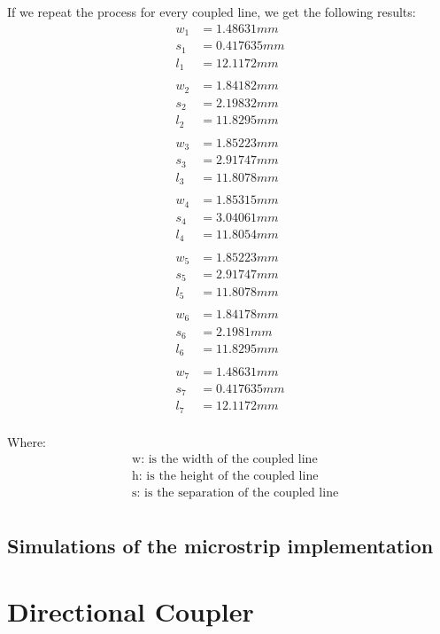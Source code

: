 \documentclass[12pt]{report} %
\begin{document}
If we repeat the process for every coupled line, we get the following results:
\begin{align*}
w_1 &= 1.48631 mm\\
s_1 &= 0.417635 mm \\
l_1 &= 12.1172 mm \\
\\
w_2 &= 1.84182 mm \\
s_2 &= 2.19832 mm \\
l_2 &= 11.8295 mm \\
\\
w_3 &= 1.85223 mm \\
s_3 &= 2.91747 mm \\
l_3 &= 11.8078 mm \\
\\
w_4 &= 1.85315 mm \\
s_4 &= 3.04061 mm \\
l_4 &= 11.8054 mm \\
\\
w_5 &= 1.85223 mm \\
s_5 &= 2.91747 mm \\
l_5 &= 11.8078 mm \\
\\
w_6 &= 1.84178 mm \\
s_6 &= 2.1981 mm \\
l_6 &= 11.8295 mm \\
\\
w_7 &= 1.48631 mm \\
s_7 &= 0.417635 mm \\
l_7 &= 12.1172 mm \\
\end{align*}

Where:
\begin{align*}
    &\text{w: is the width of the coupled line} \\
    &\text{h: is the height of the coupled line} \\
    &\text{s: is the separation of the coupled line} \\
\end{align*}

\subsection{Simulations of the microstrip implementation}

\section{Directional Coupler}
\end{document}
